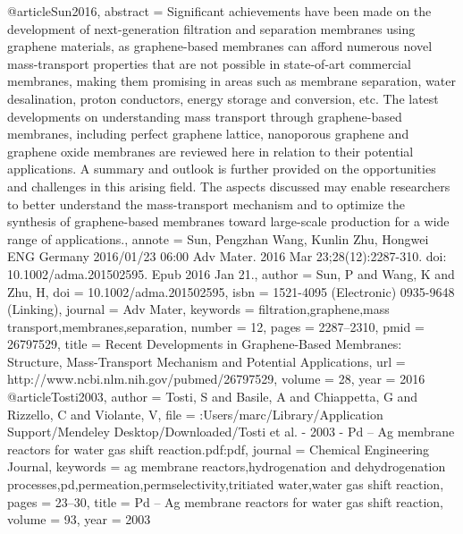@article{Sun2016,
abstract = {Significant achievements have been made on the development of next-generation filtration and separation membranes using graphene materials, as graphene-based membranes can afford numerous novel mass-transport properties that are not possible in state-of-art commercial membranes, making them promising in areas such as membrane separation, water desalination, proton conductors, energy storage and conversion, etc. The latest developments on understanding mass transport through graphene-based membranes, including perfect graphene lattice, nanoporous graphene and graphene oxide membranes are reviewed here in relation to their potential applications. A summary and outlook is further provided on the opportunities and challenges in this arising field. The aspects discussed may enable researchers to better understand the mass-transport mechanism and to optimize the synthesis of graphene-based membranes toward large-scale production for a wide range of applications.},
annote = {Sun, Pengzhan
Wang, Kunlin
Zhu, Hongwei
ENG
Germany
2016/01/23 06:00
Adv Mater. 2016 Mar 23;28(12):2287-310. doi: 10.1002/adma.201502595. Epub 2016 Jan 21.},
author = {Sun, P and Wang, K and Zhu, H},
doi = {10.1002/adma.201502595},
isbn = {1521-4095 (Electronic)
0935-9648 (Linking)},
journal = {Adv Mater},
keywords = {filtration,graphene,mass transport,membranes,separation},
number = {12},
pages = {2287--2310},
pmid = {26797529},
title = {{Recent Developments in Graphene-Based Membranes: Structure, Mass-Transport Mechanism and Potential Applications}},
url = {http://www.ncbi.nlm.nih.gov/pubmed/26797529},
volume = {28},
year = {2016}
}
@article{Tosti2003,
author = {Tosti, S and Basile, A and Chiappetta, G and Rizzello, C and Violante, V},
file = {:Users/marc/Library/Application Support/Mendeley Desktop/Downloaded/Tosti et al. - 2003 - Pd – Ag membrane reactors for water gas shift reaction.pdf:pdf},
journal = {Chemical Engineering Journal},
keywords = {ag membrane reactors,hydrogenation and dehydrogenation processes,pd,permeation,permselectivity,tritiated water,water gas shift reaction},
pages = {23--30},
title = {{Pd – Ag membrane reactors for water gas shift reaction}},
volume = {93},
year = {2003}
}
